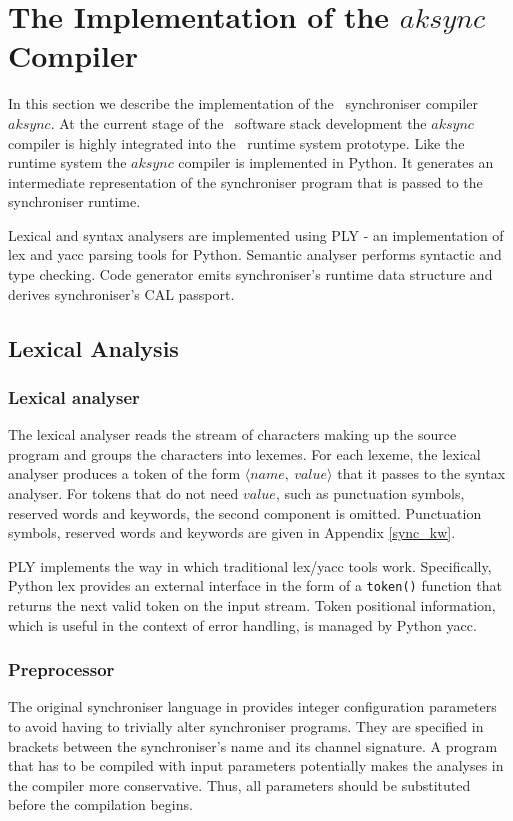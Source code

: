 \section{The Implementation of the $aksync$ Compiler}
In this section we describe the implementation of the \ak\ synchroniser compiler $aksync$. At the current stage of the \ak\ software stack development the $aksync$ compiler is highly integrated into the \ak\ runtime system prototype. Like the runtime system the $aksync$ compiler is implemented in Python. It generates an intermediate representation of the synchroniser program that is passed to the synchroniser runtime.

Lexical and syntax analysers are implemented using PLY \cite{ply} - an implementation of lex and yacc parsing tools for Python. Semantic analyser performs syntactic and type checking. Code generator emits synchroniser's runtime data structure and derives synchroniser's CAL passport.


\subsection{Lexical Analysis}
  \subsubsection{Lexical analyser}
The lexical analyser reads the stream of characters making up the source program and groups the characters into lexemes. For each lexeme, the lexical analyser produces a token of the form $\langle name, \: value \rangle$ that it passes to the syntax analyser. For tokens that do not need $value$, such as punctuation symbols, reserved words and keywords, the second component is omitted. Punctuation symbols, reserved words and keywords are given in Appendix \ref{sync_kw}.

PLY implements the way in which traditional lex/yacc tools work. Specifically, Python lex provides an external interface in the form of a \texttt{token()} function that returns the next valid token on the input stream. Token positional information, which is useful in the context of error handling, is managed by Python yacc.

  \subsubsection{Preprocessor}
The original synchroniser language in \cite{astrakahn} provides integer configuration parameters to avoid having to trivially alter synchroniser programs. They are specified in brackets between the synchroniser's name and its channel signature. A program that has to be compiled with input parameters potentially makes the analyses in the compiler more conservative. Thus, all parameters should be substituted before the compilation begins.

